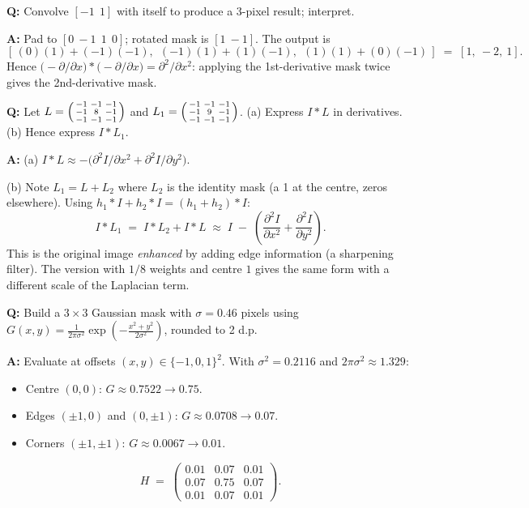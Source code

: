 \begin{exbox}
\textbf{Q:} Convolve $[-1\ \ 1]$ with itself to produce a 3-pixel result; interpret.

\textbf{A:} Pad to $[0\ -1\ \ 1\ \ 0]$; rotated mask is $[1\ -1]$. The output is
\[
[\,(0)(1) + (-1)(-1),\ \ (-1)(1) + (1)(-1),\ \ (1)(1) + (0)(-1)\,] \;=\; [1,\ -2,\ 1].
\]
Hence $\bigl(-\partial/\partial x\bigr) \ast \bigl(-\partial/\partial x\bigr) = \partial^2/\partial x^2$: applying the 1st-derivative mask twice gives the 2nd-derivative mask.
\end{exbox}

\begin{exbox}
\textbf{Q:} Let $L = \begin{psmallmatrix}-1&-1&-1\\-1&8&-1\\-1&-1&-1\end{psmallmatrix}$ and $L_1 = \begin{psmallmatrix}-1&-1&-1\\-1&9&-1\\-1&-1&-1\end{psmallmatrix}$. (a) Express $I \ast L$ in derivatives. (b) Hence express $I \ast L_1$.

\textbf{A:} (a) $I \ast L \approx -\bigl(\partial^2 I/\partial x^2 + \partial^2 I/\partial y^2\bigr)$.

(b) Note $L_1 = L + L_2$ where $L_2$ is the identity mask (a 1 at the centre, zeros elsewhere). Using $h_1 \ast I + h_2 \ast I = (h_1 + h_2) \ast I$:
\[
I \ast L_1 \;=\; I \ast L_2 + I \ast L \;\approx\; I \;-\; \left(\frac{\partial^2 I}{\partial x^2} + \frac{\partial^2 I}{\partial y^2}\right).
\]
This is the original image \emph{enhanced} by adding edge information (a sharpening filter). The version with $1/8$ weights and centre $1$ gives the same form with a different scale of the Laplacian term.
\end{exbox}

\begin{exbox}
\textbf{Q:} Build a $3 \times 3$ Gaussian mask with $\sigma = 0.46$ pixels using $G(x,y) = \frac{1}{2\pi\sigma^2}\exp\!\left(-\tfrac{x^2+y^2}{2\sigma^2}\right)$, rounded to 2 d.p.

\textbf{A:} Evaluate at offsets $(x,y) \in \{-1,0,1\}^2$. With $\sigma^2 = 0.2116$ and $2\pi\sigma^2 \approx 1.329$:
\begin{itemize}
  \item Centre $(0,0)$: $G \approx 0.7522 \to 0.75$.
  \item Edges $(\pm 1, 0)$ and $(0, \pm 1)$: $G \approx 0.0708 \to 0.07$.
  \item Corners $(\pm 1, \pm 1)$: $G \approx 0.0067 \to 0.01$.
\end{itemize}
\[
H \;=\; \begin{pmatrix} 0.01 & 0.07 & 0.01 \\ 0.07 & 0.75 & 0.07 \\ 0.01 & 0.07 & 0.01 \end{pmatrix}.
\]
\end{exbox}

